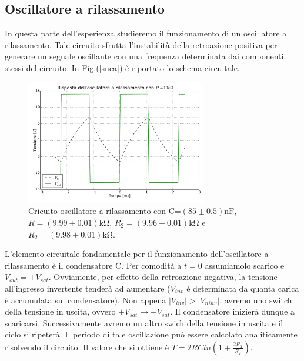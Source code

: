 \subsection{Oscillatore a rilassamento}
In questa parte dell'esperienza studieremo il funzionamento di un oscillatore a rilassamento. Tale circuito sfrutta l'instabilità della retroazione positiva per generare un segnale oscillante con una frequenza determinata dai componenti stessi del circuito. In Fig.(\ref{suca}) è riportato lo schema circuitale. 

\begin{figure}
	\begin{center}
		\includegraphics[width=0.7\textwidth]{../E04/latex/osc10k.pdf}
	\end{center}
	\caption{Cricuito oscillatore a rilassamento con C=$(85\pm0.5) \si{\nano\farad}$, $R=(9.99\pm0.01)\si{\kilo\ohm}$, $R_2=(9.96\pm0.01)\si{\kilo\ohm}$ e $R_2=(9.98\pm0.01)\si{\kilo\ohm}$.}
	\label{gr4:osc10k}
\end{figure}



L'elemento circuitale fondamentale per il funzionamento dell'oscillatore a rilassamento è il condensatore C. Per comodità a $t=0$ assumiamolo scarico e $V_{out}=+V_{sat}$. Ovviamente, per effetto della retroazione negativa, la tensione all'ingresso invertente tenderà ad aumentare ($V_{inv}$ è determinata da quanta carica è accumulata sul condensatore). Non appena $|V_{inv}|>|V_{ninv}|$, avremo uno switch della tensione in uscita, ovvero $+V_{sat} \rightarrow -V_{sat}$. Il condensatore inizierà dunque a scaricarsi. Successivamente avremo un altro swich della tensione in uscita e il ciclo si ripeterà. Il periodo di tale oscillazione può essere calcolato analiticamente risolvendo il circuito. Il valore che si ottiene è $T=2RCln(1+\frac{2R_1}{R_2})$.  





